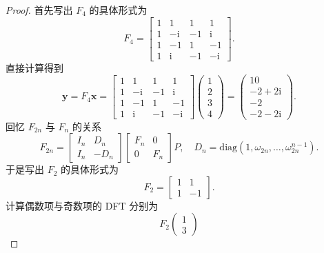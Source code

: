 \begin{proof}
    首先写出 $F_4$ 的具体形式为
    \[
        F_4 = \begin{bmatrix}
            1 & 1 & 1 & 1 \\
            1 & -\mathrm{i} & -1 & \mathrm{i} \\
            1 & -1 & 1 & -1 \\
            1 & \mathrm{i} & -1 & -\mathrm{i}
        \end{bmatrix}.
    \]
    直接计算得到
    \[
        \bm{y} = F_4 \bm{x} = \begin{bmatrix}
            1 & 1 & 1 & 1 \\
            1 & -\mathrm{i} & -1 & \mathrm{i} \\
            1 & -1 & 1 & -1 \\
            1 & \mathrm{i} & -1 & -\mathrm{i}
        \end{bmatrix} \begin{pmatrix}
            1 \\
            2 \\
            3 \\
            4
        \end{pmatrix} = \begin{pmatrix}
            10 \\
            -2 + 2\mathrm{i} \\
            -2 \\
            -2 - 2\mathrm{i}
        \end{pmatrix}.
    \]
    回忆 $F_{2n}$ 与 $F_n$ 的关系
    \[
        F_{2n} = \begin{bmatrix}
            I_n & D_n \\
            I_n & -D_n
        \end{bmatrix} \begin{bmatrix}
            F_n & 0 \\
            0 & F_n
        \end{bmatrix} P, \quad D_n = \mathrm{diag}\left(1, \omega_{2n}, \ldots, \omega_{2n}^{n - 1}\right).
    \]
    于是写出 $F_2$ 的具体形式为
    \[
        F_2 = \begin{bmatrix}
            1 & 1 \\
            1 & -1
        \end{bmatrix}.
    \]
    计算偶数项与奇数项的 DFT 分别为
    \[
        F_2 \begin{pmatrix}
            1 \\
            3

\end{pmatrix}\]
\end{proof}
